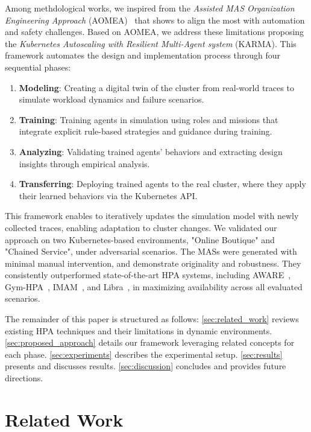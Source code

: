 \documentclass[conference]{IEEEtran}
\begin{document}
Among methdological works, we inspired from the \textit{Assisted MAS Organization Engineering Approach} (AOMEA)~\cite{soule2024aomea} that shows to align the most with automation and safety challenges. Based on AOMEA, we address these limitations proposing the \textit{Kubernetes Autoscaling with Resilient Multi-Agent system} (KARMA). This framework automates the design and implementation process through four sequential phases:
\begin{enumerate}
    \item \textbf{Modeling}: Creating a digital twin of the cluster from real-world traces to simulate workload dynamics and failure scenarios.
    \item \textbf{Training}: Training agents in simulation using roles and missions that integrate explicit rule-based strategies and guidance during training.
    \item \textbf{Analyzing}: Validating trained agents' behaviors and extracting design insights through empirical analysis.
    \item \textbf{Transferring}: Deploying trained agents to the real cluster, where they apply their learned behaviors via the Kubernetes API.
\end{enumerate}

This framework enables to iteratively updates the simulation model with newly collected traces, enabling adaptation to cluster changes. We validated our approach on two Kubernetes-based environments, "Online Boutique" and "Chained Service", under adversarial scenarios. The MASs were generated with minimal manual intervention, and demonstrate originality and robustness. They consistently outperformed state-of-the-art HPA systems, including AWARE~\cite{AWARE}, Gym-HPA~\cite{GymHPA}, IMAM~\cite{IMAM}, and Libra~\cite{Libra}, in maximizing availability across all evaluated scenarios.

The remainder of this paper is structured as follows:
\autoref{sec:related_work} reviews existing HPA techniques and their limitations in dynamic environments.
\autoref{sec:proposed_approach} details our framework leveraging related concepts for each phase.
\autoref{sec:experiments} describes the experimental setup.
\autoref{sec:results} presents and discusses results.
\autoref{sec:discussion} concludes and provides future directions.

\section{Related Work}
\label{sec:related_work}
\end{document}
